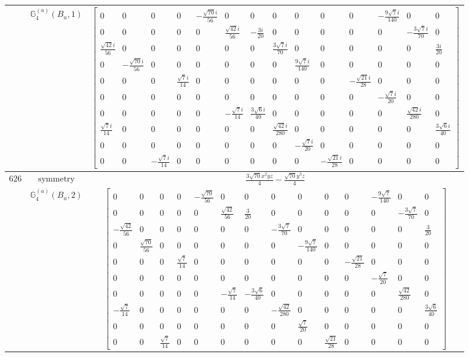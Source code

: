 \documentclass[fleqn,8pt,landscape]{jsarticle}
\begin{document}
\begin{longtable}{ccc}
$  $ & $ \mathbb{G}_{4}^{(a)}(B_{u},1) $ & $ \begin{bmatrix} 0 & 0 & 0 & 0 & - \frac{\sqrt{70} i}{56} & 0 & 0 & 0 & 0 & 0 & 0 & - \frac{9 \sqrt{7} i}{140} & 0 & 0 \\ 0 & 0 & 0 & 0 & 0 & \frac{\sqrt{42} i}{56} & - \frac{3 i}{20} & 0 & 0 & 0 & 0 & 0 & - \frac{3 \sqrt{7} i}{70} & 0 \\ \frac{\sqrt{42} i}{56} & 0 & 0 & 0 & 0 & 0 & 0 & \frac{3 \sqrt{7} i}{70} & 0 & 0 & 0 & 0 & 0 & \frac{3 i}{20} \\ 0 & - \frac{\sqrt{70} i}{56} & 0 & 0 & 0 & 0 & 0 & 0 & \frac{9 \sqrt{7} i}{140} & 0 & 0 & 0 & 0 & 0 \\ 0 & 0 & 0 & \frac{\sqrt{7} i}{14} & 0 & 0 & 0 & 0 & 0 & 0 & - \frac{\sqrt{21} i}{28} & 0 & 0 & 0 \\ 0 & 0 & 0 & 0 & 0 & 0 & 0 & 0 & 0 & 0 & 0 & - \frac{\sqrt{7} i}{20} & 0 & 0 \\ 0 & 0 & 0 & 0 & 0 & - \frac{\sqrt{7} i}{14} & \frac{3 \sqrt{6} i}{40} & 0 & 0 & 0 & 0 & 0 & \frac{\sqrt{42} i}{280} & 0 \\ \frac{\sqrt{7} i}{14} & 0 & 0 & 0 & 0 & 0 & 0 & \frac{\sqrt{42} i}{280} & 0 & 0 & 0 & 0 & 0 & \frac{3 \sqrt{6} i}{40} \\ 0 & 0 & 0 & 0 & 0 & 0 & 0 & 0 & - \frac{\sqrt{7} i}{20} & 0 & 0 & 0 & 0 & 0 \\ 0 & 0 & - \frac{\sqrt{7} i}{14} & 0 & 0 & 0 & 0 & 0 & 0 & - \frac{\sqrt{21} i}{28} & 0 & 0 & 0 & 0 \end{bmatrix} $ \\ \hline
$ 626 $ & $ \text{symmetry} $ & $ \frac{3 \sqrt{70} x^{2} y z}{4} - \frac{\sqrt{70} y^{3} z}{4} $ \\
$  $ & $ \mathbb{G}_{4}^{(a)}(B_{u},2) $ & $ \begin{bmatrix} 0 & 0 & 0 & 0 & - \frac{\sqrt{70}}{56} & 0 & 0 & 0 & 0 & 0 & 0 & - \frac{9 \sqrt{7}}{140} & 0 & 0 \\ 0 & 0 & 0 & 0 & 0 & \frac{\sqrt{42}}{56} & \frac{3}{20} & 0 & 0 & 0 & 0 & 0 & - \frac{3 \sqrt{7}}{70} & 0 \\ - \frac{\sqrt{42}}{56} & 0 & 0 & 0 & 0 & 0 & 0 & - \frac{3 \sqrt{7}}{70} & 0 & 0 & 0 & 0 & 0 & \frac{3}{20} \\ 0 & \frac{\sqrt{70}}{56} & 0 & 0 & 0 & 0 & 0 & 0 & - \frac{9 \sqrt{7}}{140} & 0 & 0 & 0 & 0 & 0 \\ 0 & 0 & 0 & \frac{\sqrt{7}}{14} & 0 & 0 & 0 & 0 & 0 & 0 & - \frac{\sqrt{21}}{28} & 0 & 0 & 0 \\ 0 & 0 & 0 & 0 & 0 & 0 & 0 & 0 & 0 & 0 & 0 & - \frac{\sqrt{7}}{20} & 0 & 0 \\ 0 & 0 & 0 & 0 & 0 & - \frac{\sqrt{7}}{14} & - \frac{3 \sqrt{6}}{40} & 0 & 0 & 0 & 0 & 0 & \frac{\sqrt{42}}{280} & 0 \\ - \frac{\sqrt{7}}{14} & 0 & 0 & 0 & 0 & 0 & 0 & - \frac{\sqrt{42}}{280} & 0 & 0 & 0 & 0 & 0 & \frac{3 \sqrt{6}}{40} \\ 0 & 0 & 0 & 0 & 0 & 0 & 0 & 0 & \frac{\sqrt{7}}{20} & 0 & 0 & 0 & 0 & 0 \\ 0 & 0 & \frac{\sqrt{7}}{14} & 0 & 0 & 0 & 0 & 0 & 0 & \frac{\sqrt{21}}{28} & 0 & 0 & 0 & 0 \end{bmatrix} $ \\ \hline

\end{longtable}
\end{document}
